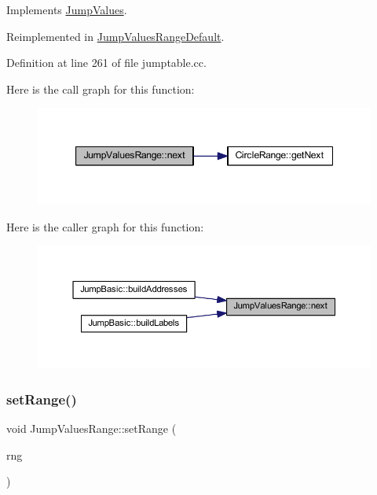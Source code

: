 Implements \mbox{\hyperlink{class_jump_values_a2533b15a8ced06d9785f3a20164c1ec8}{Jump\+Values}}.



Reimplemented in \mbox{\hyperlink{class_jump_values_range_default_a1edd06eae7c959fc1b48865fe1bf342d}{Jump\+Values\+Range\+Default}}.



Definition at line 261 of file jumptable.\+cc.

Here is the call graph for this function\+:
\nopagebreak
\begin{figure}[H]
\begin{center}
\leavevmode
\includegraphics[width=347pt]{class_jump_values_range_a1738552386fc802eaf6326a439c66bba_cgraph}
\end{center}
\end{figure}
Here is the caller graph for this function\+:
\nopagebreak
\begin{figure}[H]
\begin{center}
\leavevmode
\includegraphics[width=350pt]{class_jump_values_range_a1738552386fc802eaf6326a439c66bba_icgraph}
\end{center}
\end{figure}
\mbox{\label{class_jump_values_range_a0554839f996b5963e7463ba465fb1976}} 
\subsubsection{\texorpdfstring{setRange()}{setRange()}}
{\footnotesize\ttfamily void Jump\+Values\+Range\+::set\+Range (\begin{DoxyParamCaption}\item[{const \mbox{\hyperlink{class_circle_range}{Circle\+Range}} \&}]{rng }\end{DoxyParamCaption})\hspace{0.3cm}{\ttfamily [inline]}}



